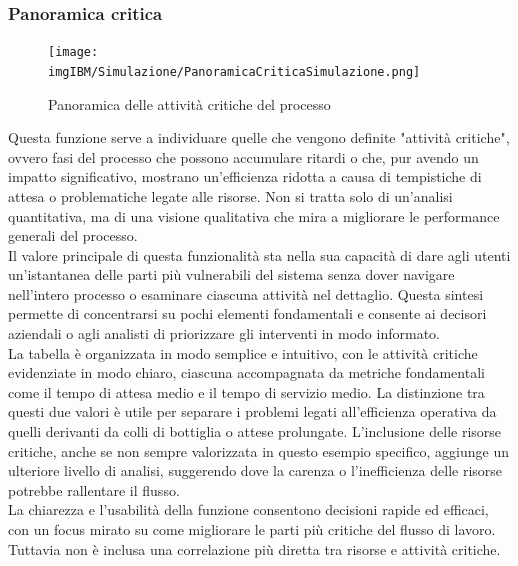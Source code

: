 \documentclass{article}
\begin{document}
\subsubsection{Panoramica critica}
 \begin{figure}[H]
    \centering
    \texttt{[image: imgIBM/Simulazione/PanoramicaCriticaSimulazione.png]}
    \caption{Panoramica delle attività critiche del processo}
    \label{fig:process-critical-activities-overview}
\end{figure}
Questa funzione serve a individuare quelle che vengono definite "attività critiche", ovvero fasi del processo che possono accumulare ritardi o che, pur avendo un impatto significativo, mostrano un'efficienza ridotta a causa di tempistiche di attesa o problematiche legate alle risorse. Non si tratta solo di un'analisi quantitativa, ma di una visione qualitativa che mira a migliorare le performance generali del processo.\\
Il valore principale di questa funzionalità sta nella sua capacità di dare agli utenti un'istantanea delle parti più vulnerabili del sistema senza dover navigare nell'intero processo o esaminare ciascuna attività nel dettaglio. Questa sintesi permette di concentrarsi su pochi elementi fondamentali e consente ai decisori aziendali o agli analisti di priorizzare gli interventi in modo informato.\\
La tabella è organizzata in modo semplice e intuitivo, con le attività critiche evidenziate in modo chiaro, ciascuna accompagnata da metriche fondamentali come il tempo di attesa medio e il tempo di servizio medio. La distinzione tra questi due valori è utile per separare i problemi legati all'efficienza operativa da quelli derivanti da colli di bottiglia o attese prolungate. L’inclusione delle risorse critiche, anche se non sempre valorizzata in questo esempio specifico, aggiunge un ulteriore livello di analisi, suggerendo dove la carenza o l'inefficienza delle risorse potrebbe rallentare il flusso.\\
La chiarezza e l'usabilità della funzione consentono decisioni rapide ed efficaci, con un focus mirato su come migliorare le parti più critiche del flusso di lavoro. Tuttavia non è inclusa una correlazione più diretta tra risorse e attività critiche.
\end{document}
